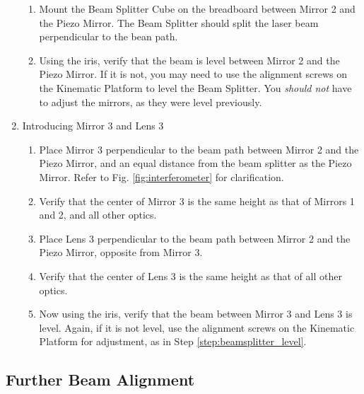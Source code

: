 \begin{enumerate}
\begin{enumerate}
        \item Mount the Beam Splitter Cube on the breadboard between
			  Mirror 2 and the Piezo Mirror. The Beam Splitter should split the laser beam perpendicular to the bean path.
        \item Using the iris, verify that the beam is level between Mirror 2 and
        the Piezo Mirror. If it is not, you may need to use the alignment screws
        on the Kinematic Platform to level the Beam Splitter. You \emph{should
        not} have to adjust the mirrors, as they were level previously.
        \label{step:beamsplitter_level}
        \end{enumerate}
    \item Introducing Mirror 3 and Lens 3
        \begin{enumerate}
        \item Place Mirror 3 perpendicular to the beam path between Mirror 2 and
        the Piezo Mirror, and an equal distance from the beam splitter as the
        Piezo Mirror. Refer to Fig. \ref{fig:interferometer} for clarification.
        \item Verify that the center of Mirror 3 is the same height as that of
        Mirrors 1 and 2, and all other optics.
        \item Place Lens 3 perpendicular to the beam path between Mirror 2 and
        the Piezo Mirror, opposite from Mirror 3. 
        \item Verify that the center of Lens 3 is the same height as that of all
        other optics.
        \item Now using the iris, verify that the beam between Mirror 3 and Lens
        3 is level. Again, if it is not level, use the alignment screws on the
        Kinematic Platform for adjustment, as in Step
        \ref{step:beamsplitter_level}.  
        \end{enumerate}
    \end{enumerate}
        
\subsection{Further Beam Alignment}
\label{sub:further}

